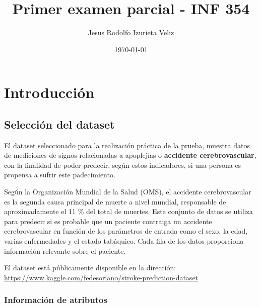 \documentclass[letter]{article}
\author{Jesus Rodolfo Izurieta Veliz}
\date{\today}
\title{Primer examen parcial - INF 354}
\begin{document}
\maketitle


\section{Introducción}
\label{sec:org50bc9ee}

\subsection{Selección del dataset}
\label{sec:org04add11}

El dataset seleccionado para la realización práctica de la prueba, muestra datos
de mediciones de signos relacionadas a apoplejías o \textbf{accidente cerebrovascular}, con la
finalidad de poder predecir, según estos indicadores, si una persona es propensa
a sufrir este padecimiento.

Según la Organización Mundial de la Salud (OMS), el accidente cerebrovascular es
la segunda causa principal de muerte a nivel mundial, responsable de
aproximadamente el 11 \% del total de muertes. Este conjunto de datos se utiliza
para predecir si es probable que un paciente contraiga un accidente
cerebrovascular en función de los parámetros de entrada como el sexo, la edad,
varias enfermedades y el estado tabáquico. Cada fila de los datos proporciona
información relevante sobre el paciente.

El dataset está públicamente disponible en la dirección: \url{https://www.kaggle.com/fedesoriano/stroke-prediction-dataset}

\subsubsection{Información de atributos}
\label{sec:orgdb6629a}
\end{document}
